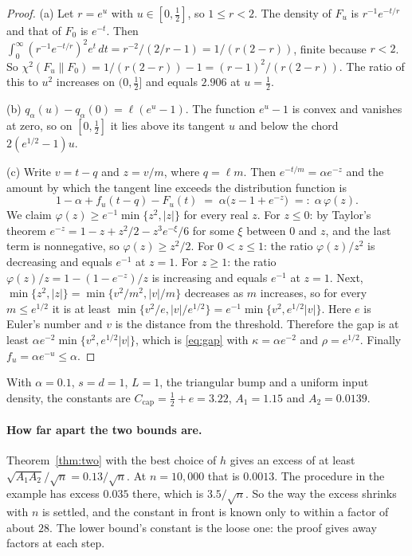 \documentclass[11pt]{article}
\theoremstyle{definition}
\theoremstyle{remark}
\newcommand{\chis}{\chi^2}
\begin{document}
\begin{proof}
(a) Let $r=e^{u}$ with $u\in[0,\tfrac12]$, so $1\le r<2$. The density of $F_u$ is
$r^{-1}e^{-t/r}$ and that of $F_0$ is $e^{-t}$. Then
$\int_0^\infty (r^{-1}e^{-t/r})^2e^{t}\,dt=r^{-2}/(2/r-1)=1/(r(2-r))$, finite because
$r<2$. So $\chis(F_u\|F_0)=1/(r(2-r))-1=(r-1)^2/(r(2-r))$. The ratio of this to $u^2$
increases on $(0,\tfrac12]$ and equals $2.906$ at $u=\tfrac12$.

(b) $q_\alpha(u)-q_\alpha(0)=\ell(e^u-1)$. The function $e^u-1$ is convex and vanishes at
zero, so on $[0,\tfrac12]$ it lies above its tangent $u$ and below the chord
$2(e^{1/2}-1)u$.

(c) Write $v=t-q$ and $z=v/m$, where $q=\ell m$. Then $e^{-t/m}=\alpha e^{-z}$ and the
amount by which the tangent line exceeds the distribution function is
\[
  1-\alpha+f_u(t-q)-F_u(t)\;=\;\alpha\big(z-1+e^{-z}\big)\;=:\;\alpha\,\varphi(z).
\]
We claim $\varphi(z)\ge e^{-1}\min\{z^2,|z|\}$ for every real $z$. For $z\le0$: by Taylor's
theorem $e^{-z}=1-z+z^2/2-z^3e^{-\xi}/6$ for some $\xi$ between $0$ and $z$, and the last
term is nonnegative, so $\varphi(z)\ge z^2/2$. For $0<z\le1$: the ratio $\varphi(z)/z^2$ is
decreasing and equals $e^{-1}$ at $z=1$. For $z\ge1$: the ratio
$\varphi(z)/z=1-(1-e^{-z})/z$ is increasing and equals $e^{-1}$ at $z=1$. Next,
$\min\{z^2,|z|\}=\min\{v^2/m^2,|v|/m\}$ decreases as $m$ increases, so for every
$m\le e^{1/2}$ it is at least $\min\{v^2/e,|v|/e^{1/2}\}=e^{-1}\min\{v^2,e^{1/2}|v|\}$.
Here $e$ is Euler's number and $v$ is the distance from the threshold. Therefore the gap
is at least $\alpha e^{-2}\min\{v^2,e^{1/2}|v|\}$, which is
\eqref{eq:gap} with $\kappa=\alpha e^{-2}$ and $\rho=e^{1/2}$. Finally
$f_u=\alpha e^{-u}\le\alpha$.
\end{proof}

With $\alpha=0.1$, $s=d=1$, $L=1$, the triangular bump and a uniform input density, the
constants are $C_{\mathrm{cap}}=\tfrac12+e=3.22$, $A_1=1.15$ and $A_2=0.0139$.

\paragraph{How far apart the two bounds are.}
Theorem~\ref{thm:two} with the best choice of $h$ gives an excess of at least
$\sqrt{A_1A_2}/\sqrt n=0.13/\sqrt n$. At $n=10{,}000$ that is $0.0013$. The procedure in
the example has excess $0.035$ there, which is $3.5/\sqrt n$. So the way the excess shrinks
with $n$ is settled, and the constant in front is known only to within a factor of about
$28$. The lower bound's constant is the loose one: the proof gives away factors at each
step.
\end{document}
